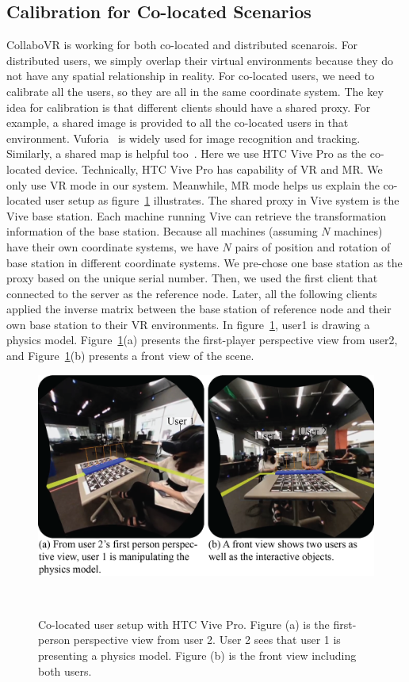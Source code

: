 \documentclass{sigchi}
\begin{document}
\subsection{Calibration for Co-located Scenarios}
CollaboVR is working for both co-located and distributed scenarois. For distributed users, we simply overlap their virtual environments because they do not have any spatial relationship in reality. For co-located users, we need to calibrate all the users, so they are all in the same coordinate system. The key idea for calibration is that different clients should have a shared proxy. For example, a shared image is provided to all the co-located users in that environment. Vuforia~\cite{Vuforia} is widely used for image recognition and tracking. Similarly, a shared map is helpful too~\cite{Hololens}. Here we use HTC Vive Pro as the co-located device. Technically, HTC Vive Pro has capability of VR and MR. We only use VR mode in our system. Meanwhile, MR mode helps us explain the co-located user setup as figure~\ref{fig:vivepro} illustrates. The shared proxy in Vive system is the Vive base station. Each machine running Vive can retrieve the transformation information of the base station. Because all machines (assuming $N$ machines) have their own coordinate systems, we have $N$ pairs of position and rotation of base station in different coordinate systems. We pre-chose one base station as the proxy based on the unique serial number. Then, we used the first client that connected to the server as the reference node. Later, all the following clients applied the inverse matrix between the base station of reference node and their own base station to their VR environments. In figure~\ref{fig:vivepro}, user1 is drawing a physics model. Figure~\ref{fig:vivepro}(a) presents the first-player perspective view from user2, and Figure~\ref{fig:vivepro}(b) presents a front view of the scene.

\begin{figure}[tb!]
 \centering
 \includegraphics[width=0.95\columnwidth]{Figure5.png}
 \caption{Co-located user setup with HTC Vive Pro. Figure (a) is the first-person perspective view from user 2. User 2 sees that user 1 is presenting a physics model. Figure (b) is the front view including both users.
 }~\label{fig:vivepro}
\end{figure}
\end{document}
